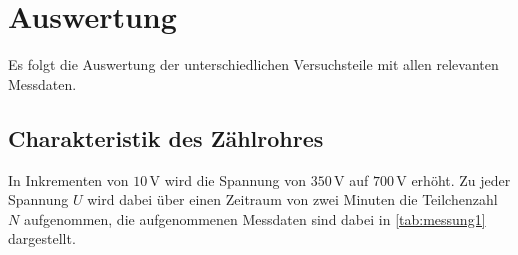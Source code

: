 \section{Auswertung}
\label{sec:auswertung}

Es folgt die Auswertung der unterschiedlichen
Versuchsteile mit allen relevanten Messdaten.


\subsection{Charakteristik des Zählrohres}
\label{subsec:charakteristik}

In Inkrementen von $10 \,\unit{\volt}$ wird die Spannung von $350 \,\unit{\volt}$ auf $700 \,\unit{\volt}$ erhöht.
Zu jeder Spannung $U$ wird dabei über einen Zeitraum von zwei Minuten die Teilchenzahl $N$ aufgenommen, die aufgenommenen Messdaten sind dabei in \autoref{tab:messung1} dargestellt.

